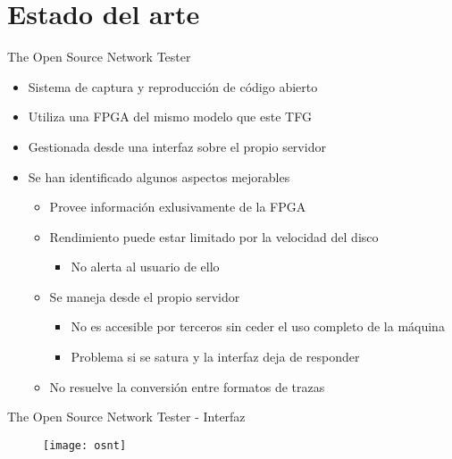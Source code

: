 \section{Estado del arte}

\begin{frame}{The Open Source Network Tester}
  \begin{itemize}
    \item Sistema de captura y reproducción de código abierto
    \item Utiliza una FPGA del mismo modelo que este TFG
    \item Gestionada desde una interfaz sobre el propio servidor
    \item Se han identificado algunos aspectos mejorables
    \begin{itemize}
      \item Provee información exlusivamente de la FPGA
      \item Rendimiento puede estar limitado por la velocidad del disco
      \begin{itemize}
        \item No alerta al usuario de ello
      \end{itemize}
      \item Se maneja desde el propio servidor
      \begin{itemize}
        \item No es accesible por terceros sin ceder el uso completo de la máquina
        \item Problema si se satura y la interfaz deja de responder
      \end{itemize}
      \item No resuelve la conversión entre formatos de trazas
    \end{itemize}
  \end{itemize}
\end{frame}

\begin{frame}{The Open Source Network Tester - Interfaz}
  \begin{figure}
    \texttt{[image: osnt]}
  \end{figure}
\end{frame}
